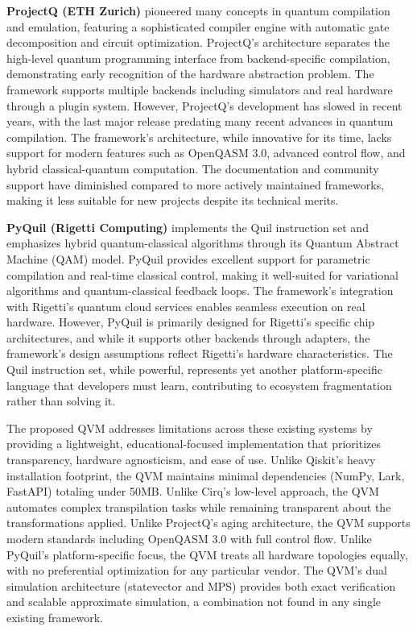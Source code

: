 \textbf{ProjectQ (ETH Zurich)} pioneered many concepts in quantum compilation and emulation, featuring a sophisticated compiler engine with automatic gate decomposition and circuit optimization. ProjectQ's architecture separates the high-level quantum programming interface from backend-specific compilation, demonstrating early recognition of the hardware abstraction problem. The framework supports multiple backends including simulators and real hardware through a plugin system. However, ProjectQ's development has slowed in recent years, with the last major release predating many recent advances in quantum compilation. The framework's architecture, while innovative for its time, lacks support for modern features such as OpenQASM 3.0, advanced control flow, and hybrid classical-quantum computation. The documentation and community support have diminished compared to more actively maintained frameworks, making it less suitable for new projects despite its technical merits.

\textbf{PyQuil (Rigetti Computing)} implements the Quil instruction set and emphasizes hybrid quantum-classical algorithms through its Quantum Abstract Machine (QAM) model. PyQuil provides excellent support for parametric compilation and real-time classical control, making it well-suited for variational algorithms and quantum-classical feedback loops. The framework's integration with Rigetti's quantum cloud services enables seamless execution on real hardware. However, PyQuil is primarily designed for Rigetti's specific chip architectures, and while it supports other backends through adapters, the framework's design assumptions reflect Rigetti's hardware characteristics. The Quil instruction set, while powerful, represents yet another platform-specific language that developers must learn, contributing to ecosystem fragmentation rather than solving it.

The proposed QVM addresses limitations across these existing systems by providing a lightweight, educational-focused implementation that prioritizes transparency, hardware agnosticism, and ease of use. Unlike Qiskit's heavy installation footprint, the QVM maintains minimal dependencies (NumPy, Lark, FastAPI) totaling under 50MB. Unlike Cirq's low-level approach, the QVM automates complex transpilation tasks while remaining transparent about the transformations applied. Unlike ProjectQ's aging architecture, the QVM supports modern standards including OpenQASM 3.0 with full control flow. Unlike PyQuil's platform-specific focus, the QVM treats all hardware topologies equally, with no preferential optimization for any particular vendor. The QVM's dual simulation architecture (statevector and MPS) provides both exact verification and scalable approximate simulation, a combination not found in any single existing framework.

